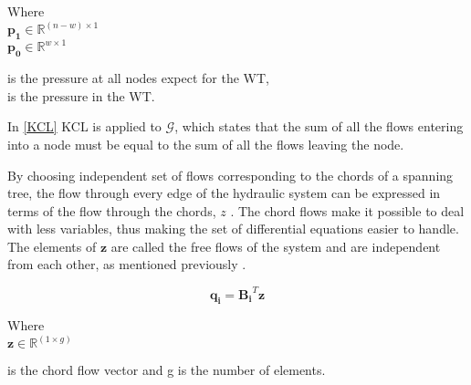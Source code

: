\begin{minipage}[t]{0.20\textwidth}
Where\\
\hspace*{8mm} $\pmb{p_1} \in \mathbb{R}^{(n-w) \times 1}$  \\
\hspace*{8mm} $\pmb{p_0} \in \mathbb{R}^{w \times 1} $ 
\end{minipage}
\begin{minipage}[t]{0.68\textwidth}
\vspace*{2mm}
\hspace*{4mm} is the pressure at all nodes expect for the WT,\\
\hspace*{4mm} is the pressure in the WT.
\end{minipage}

In \eqref{KCL} KCL is applied to $\mathcal{G}$, which states that the sum of all the flows entering into a node must be equal to the sum of all the flows leaving the node.

By choosing independent set of flows corresponding to the chords of a spanning tree, the flow through every edge of the hydraulic system can be expressed in terms of the flow through the chords, $z$ \cite{GraphModel}.
The chord flows make it possible to deal with less variables, thus making the set of differential equations easier to handle.  The elements of $\pmb{z}$ are called the free flows of the system and are independent from each other, as mentioned previously \cite{GraphTheoryCarsten}.

\begin{equation}
  \pmb{q_i} = \pmb{B_i} ^{T}  \pmb{z}
  \label{ChordRelation}
\end{equation}

\begin{minipage}[t]{0.20\textwidth}
Where\\
\hspace*{8mm} $\pmb{z} \in \mathbb{R}^{(1 \times g)} $ 
\end{minipage}
\begin{minipage}[t]{0.68\textwidth}
\vspace*{2mm}
\hspace*{4mm} is the chord flow vector and g is the number of elements.
\end{minipage}

